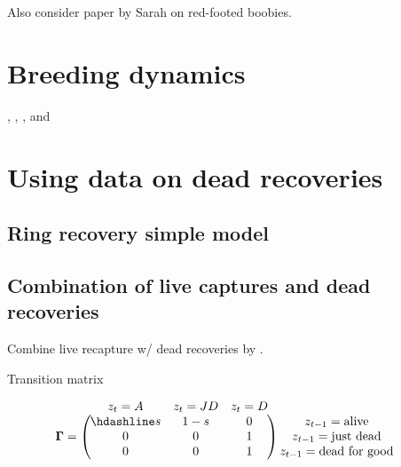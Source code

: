 \documentclass[
  12pt,
]{krantz}
\begin{document}
Also consider paper by Sarah on red-footed boobies.

\section{Breeding dynamics}\label{breeding-dynamics}

\citet{pradel_breeding_2012}, \citet{desprez_now_2011}, \citet{desprez_known_2013}, and \citet{pacoureau_population_2019}

\section{Using data on dead recoveries}\label{using-data-on-dead-recoveries}

\subsection{Ring recovery simple model}\label{ring-recovery-simple-model}

\subsection{Combination of live captures and dead recoveries}\label{combination-of-live-captures-and-dead-recoveries}

Combine live recapture w/ dead recoveries by \citet{lebreton1999}.

Transition matrix

\[\begin{matrix}
& \\
\mathbf{\Gamma} =
  \left ( \vphantom{ \begin{matrix} 12 \\ 12 \\ 12 \end{matrix} } \right .
          \end{matrix}
          \hspace{-1.2em}
          \begin{matrix}
          z_t=A & z_t=JD & z_t=D \\ \hdashline
          s & 1-s & 0\\
          0 & 0 & 1\\
          0 & 0 & 1
          \end{matrix}
          \hspace{-0.2em}
          \begin{matrix}
          & \\
          \left . \vphantom{ \begin{matrix} 12 \\ 12 \\ 12 \end{matrix} } \right )
\begin{matrix}
z_{t-1}=\text{alive} \\ z_{t-1}=\text{just dead} \\ z_{t-1}=\text{dead for good}
\end{matrix}
\end{matrix}\]
\end{document}
